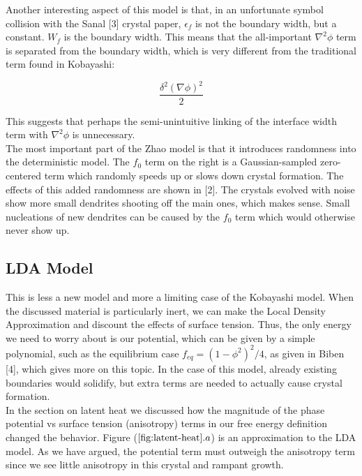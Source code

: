 \documentclass[10pt]{article} %
\begin{document}
Another interesting aspect of this model is that, in an unfortunate symbol collision with the Sanal [3] crystal paper, $\epsilon_f$ is not the boundary width, but a constant. $W_f$ is the boundary width. This means that the all-important $\nabla^2\phi$ term is separated from the boundary width, which is very different from the traditional term found in Kobayashi:

\begin{equation}
  \frac{\delta^2(\nabla\phi)^2}{2}
\end{equation}

This suggests that perhaps the semi-unintuitive linking of the interface width term with $\nabla^2\phi$ is unnecessary.\\

The most important part of the Zhao model is that it introduces randomness into the deterministic model. The $f_0$ term on the right is a Gaussian-sampled zero-centered term which randomly speeds up or slows down crystal formation. The effects of this added randomness are shown in [2]. The crystals evolved with noise show more small dendrites shooting off the main ones, which makes sense. Small nucleations of new dendrites can be caused by the $f_0$ term which would otherwise never show up.\\

\subsection{LDA Model}
This is less a new model and more a limiting case of the Kobayashi model. When the discussed material is particularly inert, we can make the Local Density Approximation and discount the effects of surface tension. Thus, the only energy we need to worry about is our potential, which can be given by a simple polynomial, such as the equilibrium case $f_{eq} = (1-\phi^2)^2/4$, as given in Biben [4], which gives more on this topic. In the case of this model, already existing boundaries would solidify, but extra terms are needed to actually cause crystal formation.\\

In the section on latent heat we discussed how the magnitude of the phase potential vs surface tension (anisotropy) terms in our free energy definition changed the behavior. Figure ($\ref{fig:latent-heat}.a$) is an approximation to the LDA model. As we have argued, the potential term must outweigh the anisotropy term since we see little anisotropy in this crystal and rampant growth.\\
\end{document}
